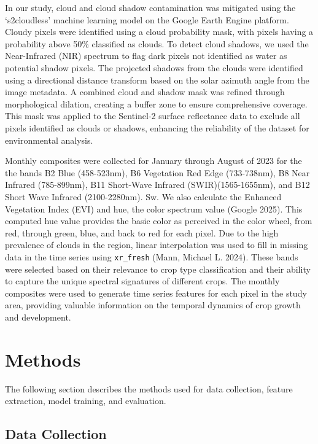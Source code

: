 \documentclass[
  journal,
  twocolumn]{IEEEtran}
\begin{document}
In our study, cloud and cloud shadow contamination was mitigated using
the `s2cloudless' machine learning model on the Google Earth Engine
platform. Cloudy pixels were identified using a cloud probability mask,
with pixels having a probability above 50\% classified as clouds. To
detect cloud shadows, we used the Near-Infrared (NIR) spectrum to flag
dark pixels not identified as water as potential shadow pixels. The
projected shadows from the clouds were identified using a directional
distance transform based on the solar azimuth angle from the image
metadata. A combined cloud and shadow mask was refined through
morphological dilation, creating a buffer zone to ensure comprehensive
coverage. This mask was applied to the Sentinel-2 surface reflectance
data to exclude all pixels identified as clouds or shadows, enhancing
the reliability of the dataset for environmental analysis.

Monthly composites were collected for January through August of 2023 for
the the bands B2 Blue (458-523nm), B6 Vegetation Red Edge (733-738nm),
B8 Near Infrared (785-899nm), B11 Short-Wave Infrared
(SWIR)(1565-1655nm), and B12 Short Wave Infrared (2100-2280nm). Sw. We
also calculate the Enhanced Vegetation Index (EVI) and hue, the color
spectrum value (Google 2025). This computed hue value provides the basic
color as perceived in the color wheel, from red, through green, blue,
and back to red for each pixel. Due to the high prevalence of clouds in
the region, linear interpolation was used to fill in missing data in the
time series using \texttt{xr\_fresh} (Mann, Michael L. 2024). These
bands were selected based on their relevance to crop type classification
and their ability to capture the unique spectral signatures of different
crops. The monthly composites were used to generate time series features
for each pixel in the study area, providing valuable information on the
temporal dynamics of crop growth and development.

\hypertarget{methods}{%
\section{Methods}\label{methods}}

The following section describes the methods used for data collection,
feature extraction, model training, and evaluation.

\hypertarget{data-collection}{%
\subsection{Data Collection}\label{data-collection}}
\end{document}
